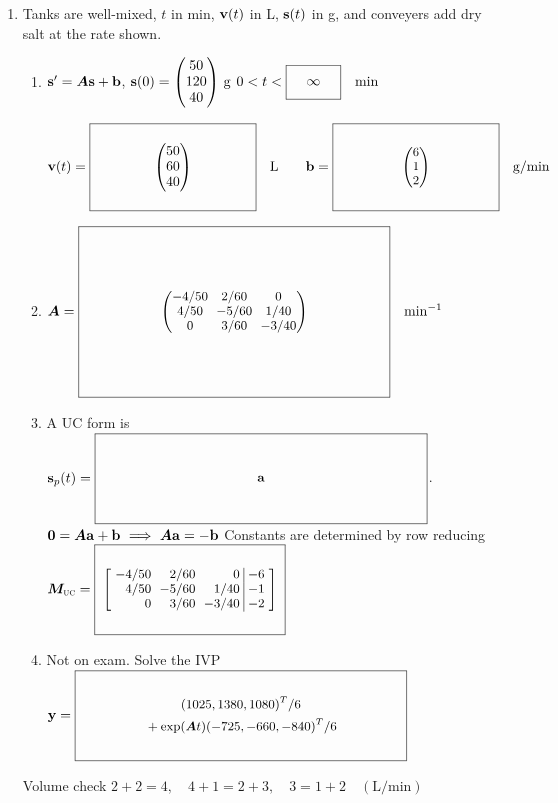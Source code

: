 \documentclass[11pt,letterpaper]{article}
\newcommand{\mat}[1]{\bm{#1}}
\newcommand{\TimeBlank}[1][]{%
  \vcenter{\hbox{$\boxed{\parbox[c][0.25in][c]{0.45in}{\centering\ensuremath{#1}}}$}}}
\newcommand{\KeyBox}[3]{%
  \vcenter{\hbox{$\boxed{\parbox[c][#2][c]{#1}{\centering\small
    \setlength{\arraycolsep}{3pt}\renewcommand{\arraystretch}{0.95}%
    \ensuremath{\displaystyle #3}}}$}}}
\begin{document}
\begin{enumerate}
\begin{enumerate}
\end{enumerate}
\hfill{\footnotesize Volume check: \quad $3+2=5,\quad5+2=2+5,\quad5=2+3\quad(\mathrm{L/min})$}\par

\newpage
\item \mbox{} \newline
{}
\newline
Tanks are well-mixed, $t$ in min, $\mathbf{v}(t)$ in L, $\mathbf{s}(t)$ in g, and conveyers add dry salt at the rate shown. 
\begin{enumerate}
\item
$\vect{s}'=\mat{A}\vect{s}+\vect{b}$,
$\vect{s}(0)=\begin{pmatrix}50\\120\\40\end{pmatrix}\,\mathrm{g}$\quad
$0<t<\TimeBlank[\infty]\quad\mathrm{min}$

\noindent $\vect{v}(t)=\vcenter{\hbox{$\boxed{\parbox[c][0.80in][c]{1.6in}{\centering$\begin{pmatrix}50\\60\\40\end{pmatrix}$}}$}}\quad\mathrm{L}\qquad
\vect{b}=\KeyBox{1.6in}{0.80in}{\begin{pmatrix}6\\1\\2\end{pmatrix}}\quad\mathrm{g/min}$
\item $\mat{A}=\KeyBox{3.0in}{1.60in}{\begin{pmatrix}- 4/50&2/60&0\\4/50&- 5/60&1/40\\0&3/60&- 3/40\end{pmatrix}}\quad\mathrm{min}^{-1}$
\item A UC form is $\vect{s}_p(t)=\KeyBox{3.2in}{0.80in}{\vect{a}}$. 
\hfill{\footnotesize $\vect{0}=\mat{A}\vect{a}+\vect{b}\ \Longrightarrow\ \mat{A}\vect{a}=-\vect{b}$}
Constants are determined by row reducing
$\mat{M}_{\text{\textsc{uc}}}=\KeyBox{1.8in}{0.80in}{\left[\begin{array}{rrr|r}- 4/50&2/60&0&-6\\4/50&- 5/60&1/40&-1\\0&3/60&- 3/40&-2\end{array}\right]}$

\item Not on exam. Solve the IVP
$\vect{y} =\KeyBox{3.2in}{0.80in}{\begin{gathered}(1025,1380,1080)^T/6\\{}+\exp(\mat{A}t)(-725,-660,-840)^T/6\end{gathered}}$
\end{enumerate}
\hfill{\footnotesize Volume check $2+2=4,\quad4+1=2+3,\quad3=1+2\quad(\mathrm{L/min})$}\par
\end{enumerate}
\end{document}
